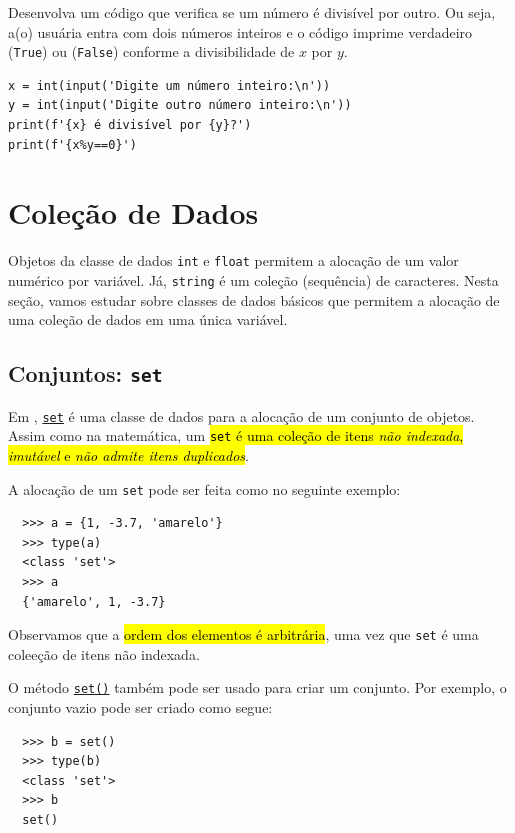 \begin{exer}
  Desenvolva um código que verifica se um número é divisível por outro. Ou seja, a(o) usuária entra com dois números inteiros e o código imprime verdadeiro (\lstinline+True+) ou (\lstinline+False+) conforme a divisibilidade de $x$ por $y$.
\end{exer}
\begin{resp}
\begin{lstlisting}
x = int(input('Digite um número inteiro:\n'))
y = int(input('Digite outro número inteiro:\n'))
print(f'{x} é divisível por {y}?')
print(f'{x%y==0}')
\end{lstlisting}
\end{resp}

\section{Coleção de Dados}\label{cap_lingua_sec_colecao}

Objetos da classe de dados \lstinline+int+ e \lstinline+float+ permitem a alocação de um valor numérico por variável. Já, \lstinline+string+ é um coleção (sequência) de caracteres. Nesta seção, vamos estudar sobre classes de dados básicos que permitem a alocação de uma coleção de dados em uma única variável.

\subsection{Conjuntos: \lstinline+set+}

Em {\python}, \href{https://docs.python.org/3/tutorial/datastructures.html#sets}{\lstinline+set+} é uma classe de dados para a alocação de um conjunto de objetos. Assim como na matemática, um \hl{{\lstinline+set+} é uma coleção de itens \emph{não indexada}, \emph{imutável} e \emph{não admite itens duplicados}}.

A alocação de um \lstinline+set+ pode ser feita como no seguinte exemplo:
\begin{lstlisting}
  >>> a = {1, -3.7, 'amarelo'}
  >>> type(a)
  <class 'set'>
  >>> a
  {'amarelo', 1, -3.7}
\end{lstlisting}
Observamos que a \hl{ordem dos elementos é arbitrária}, uma vez que \lstinline+set+ é uma coleeção de itens não indexada.

O método \href{https://docs.python.org/3/library/stdtypes.html#set}{\lstinline+set()+} também pode ser usado para criar um conjunto. Por exemplo, o conjunto vazio pode ser criado como segue:
\begin{lstlisting}
  >>> b = set()
  >>> type(b)
  <class 'set'>
  >>> b
  set()
\end{lstlisting}

